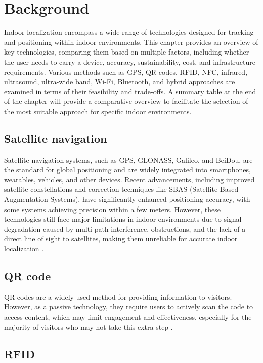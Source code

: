 \chapter{Background}
\label{chap:background}

Indoor localization encompass a wide range of technologies designed for tracking and positioning within indoor environments. This chapter provides an overview of key technologies, comparing them based on multiple factors, including whether the user needs to carry a device, accuracy, sustainability, cost, and infrastructure requirements. Various methods such as GPS, QR codes, RFID, NFC, infrared, ultrasound, ultra-wide band, Wi-Fi, Bluetooth, and hybrid approaches are examined in terms of their feasibility and trade-offs. A summary table at the end of the chapter will provide a comparative overview to facilitate the selection of the most suitable approach for specific indoor environments.

\section{Satellite navigation}

Satellite navigation systems, such as GPS, GLONASS, Galileo, and BeiDou, are the standard for global positioning and are widely integrated into smartphones, wearables, vehicles, and other devices. Recent advancements, including improved satellite constellations and correction techniques like SBAS (Satellite-Based Augmentation Systems), have significantly enhanced positioning accuracy, with some systems achieving precision within a few meters. However, these technologies still face major limitations in indoor environments due to signal degradation caused by multi-path interference, obstructions, and the lack of a direct line of sight to satellites, making them unreliable for accurate indoor localization \cite{mainetti_survey_2014}. 

\section{QR code}

QR codes are a widely used method for providing information to visitors. However, as a passive technology, they require users to actively scan the code to access content, which may limit engagement and effectiveness, especially for the majority of visitors who may not take this extra step \cite{spachos_ble_2020}. 

\section{RFID}

